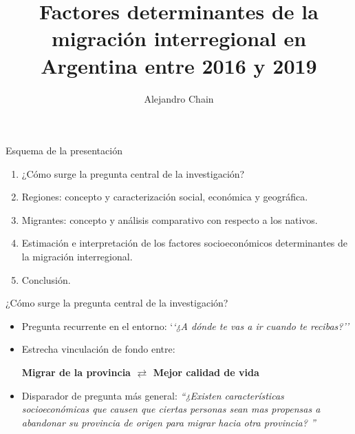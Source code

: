 \documentclass[11pt]{beamer}
\author{Alejandro Chain}
\title{Factores determinantes de la migración interregional en Argentina entre 2016 y 2019}
\institute{Asociación Argentina de Economía Política}
\begin{document}
\begin{frame}
\titlepage
\end{frame}



\begin{frame}[t]{Esquema de la presentación}

\begin{enumerate}

\item ¿Cómo surge la pregunta central de la investigación?
\vspace{0.5 cm}
\item Regiones: concepto y caracterización social, económica y geográfica.
\vspace{0.5 cm}
\item Migrantes: concepto y análisis comparativo con respecto a los nativos.
 \vspace{0.5 cm}
 \item Estimación e interpretación de los factores socioeconómicos determinantes de la migración interregional.
 \vspace{0.5 cm}
 \item Conclusión.
\end{enumerate}


\end{frame}




\begin{frame}[t]{¿Cómo surge la pregunta central de la investigación?}
\begin{itemize}
\item Pregunta recurrente en el entorno: `\textit{`¿A dónde te vas a ir cuando te recibas?''}
\vspace{0.5 cm}
\item Estrecha vinculación de fondo entre: 
        \begin{center}
         \textbf{ Migrar de la provincia $\rightleftarrows$ Mejor calidad de vida }
         \end{center}
 \vspace{0.5 cm}
 \item Disparador de pregunta más general: \textit{``¿Existen características socioeconómicas que causen que ciertas personas sean mas propensas a abandonar su provincia de origen para migrar hacia otra provincia? ''}
\end{itemize}

\end{frame}
\end{document}
